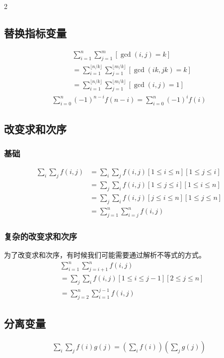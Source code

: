 \documentclass[8pt,a4paper]{article}
\begin{document}
\begin{multicols}{2}
    \subsection{替换指标变量}
    \begin{align*}
        &\sum_{i=1}^{n} \sum_{j=1}^{m} [\gcd(i,j) = k] \\
        &= \sum_{i=1}^{\lfloor n/k \rfloor} \sum_{j=1}^{\lfloor m/k \rfloor} [\gcd(ik,jk)=k] \\
        &= \sum_{i=1}^{\lfloor n/k \rfloor} \sum_{j=1}^{\lfloor m/k \rfloor} [\gcd(i,j)=1]
    \end{align*}
    \begin{align*}
        \sum_{i=0}^{n} (-1)^{n-i} f(n-i) = \sum_{i=0}^{n} (-1)^{i} f(i)
    \end{align*}

    \subsection{改变求和次序}
    \subsubsection{基础}
    \begin{align*}
        \sum_i \sum_j f(i,j) 
        &= \sum_i \sum_j f(i,j) [1 \le i \le n] [1 \le j \le i] \\
        &= \sum_j \sum_i f(i,j) [1 \le j \le i] [1 \le i \le n] \\
        &= \sum_j \sum_i f(i,j) [j \le i \le n] [1 \le j \le n] \\
        &= \sum_{j=1}^{n} \sum_{i=j}^{n} f(i,j)
    \end{align*}
    \subsubsection{复杂的改变求和次序}
    为了改变求和次序，有时候我们可能需要通过解析不等式的方式。
    \begin{align*}
        &\sum_{i=1}^{n} \sum_{j=i+1}^{n} f(i,j) \\
        &= \sum_j \sum_i f(i,j) [1 \le i \le j-1] [2 \le j \le n] \\
        &= \sum_{j=2}^{n} \sum_{i=1}^{j-1} f(i,j)
    \end{align*}

    \subsection{分离变量}
    \begin{align*}
        \sum_i \sum_j f(i)g(j) = \left( \sum_i f(i) \right) \left( \sum_j g(j) \right)
    \end{align*}


\end{multicols}
\end{document}
